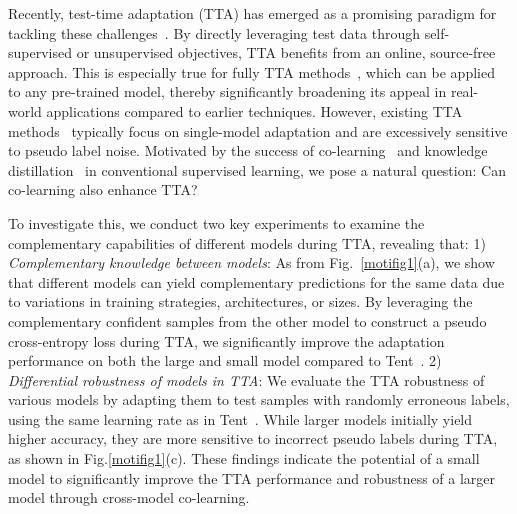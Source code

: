 
Recently, test-time adaptation (TTA) has emerged as a promising paradigm for tackling these challenges~\cite{sun2020test,liu2021ttt++,niu2023towards,lee2024entropy,liang2024comprehensive}. By directly leveraging test data through self-supervised or unsupervised objectives, TTA benefits from an online, source-free approach. This is especially true for fully TTA methods~\cite{wang2020tent,niu2022efficient}, which can be applied to any pre-trained model, thereby significantly broadening its appeal in real-world applications compared to earlier techniques. 
However, existing TTA methods~\cite{wang2020tent,niu2022efficient,lee2024entropy} typically focus on single-model adaptation and are excessively sensitive to pseudo label noise. 
Motivated by the success of co-learning~\cite{zhang2018deep} and knowledge distillation~\cite{hinton2015distilling,mirzadeh2020improved} in conventional supervised learning, we pose a natural question: Can co-learning also enhance TTA? 

To investigate this, we conduct two key experiments to examine the complementary capabilities of different models during TTA, revealing that: 1) \textit{Complementary knowledge between models}: As from Fig.~\ref{motifig1}(a), we show that different models can yield complementary predictions for the same data due to variations in training strategies, architectures, or sizes.
By leveraging the complementary confident samples from the other model to construct a pseudo cross-entropy loss during TTA, we significantly improve the adaptation performance on both the large and small model compared to Tent~\cite{wang2020tent}. 2) \textit{Differential robustness of models in TTA}: We evaluate the TTA robustness of various models by adapting them to test samples with randomly erroneous labels, using the same learning rate as in Tent~\cite{wang2020tent}. While larger models initially yield higher accuracy, they are more sensitive to incorrect pseudo labels during TTA, as shown in Fig.\ref{motifig1}(c). These findings indicate the potential of a small model to significantly improve the TTA performance and robustness of a larger model through cross-model co-learning.


